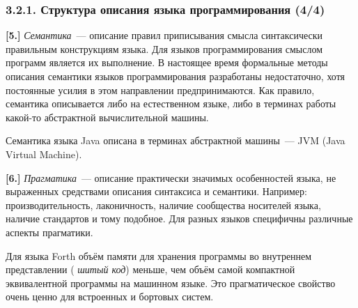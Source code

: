 \documentclass[mathserif,12pt,aspectratio=169]{beamer}
\renewcommand{\index}[1]{}
\def\odmkey#1#2{{\it\color{red} #1}\index{#2}}
\begin{document}
\begin{frame}
\frametitle{3.2.1. Структура описания языка программирования (4/4)}

{\color{blue}\bf [5.]} \odmkey{Семантика}{Семантика}~--- описание правил
приписывания смысла синтаксически правильным конструкциям языка.
Для языков программирования смыслом программ является их
выполнение. В настоящее время формальные методы описания семантики
языков программирования разработаны недостаточно, хотя постоянные
усилия в этом направлении предпринимаются. Как правило, семантика
описывается либо на естественном языке, либо в терминах работы
какой-то абстрактной вычислительной машины.

\smallskip
\begin{example}
Семантика языка Java описана в терминах абстрактной машины~--- JVM
(Java Virtual Machine).
\end{example}

{\color{blue}\bf [6.]} \odmkey{Прагматика}{Прагматика}~--- описание 
практически значимых особенностей языка, не выраженных
средствами описания синтаксиса и семантики. 
Например: производительность,
лаконичность, наличие сообщества носителей языка, наличие стандартов и тому подобное.
Для разных языков специфичны различные аспекты прагматики.

\begin{example}
Для языка Forth объём памяти для хранения программы во 
внутреннем представлении (\odmkey{шитый код}{Шитый код}) меньше,
чем объём самой компактной эквивалентной программы на машинном языке.
Это прагматическое свойство очень ценно для встроенных и бортовых систем.
\end{example}  

\end{frame}
\end{document}
